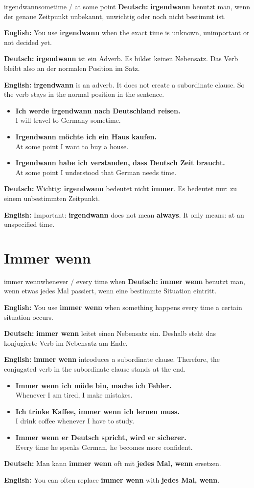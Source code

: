 \documentclass[a4paper,11pt]{article}
\newcommand{\GermanText}[1]{\textbf{Deutsch: }#1\par}
\newcommand{\EnglishText}[1]{{\small\color{SoftGray}\textbf{English: }#1\par}}
\newcommand{\ExampleItem}[2]{\item \textbf{#1}\\{\small\color{SoftGray}#2}}
\begin{document}
\begin{grammarentry}{irgendwann}{sometime / at some point}
\GermanText{\textbf{irgendwann} benutzt man, wenn der genaue Zeitpunkt unbekannt, unwichtig oder noch nicht bestimmt ist.}
\EnglishText{You use \textbf{irgendwann} when the exact time is unknown, unimportant or not decided yet.}

\GermanText{\textbf{irgendwann} ist ein Adverb. Es bildet keinen Nebensatz. Das Verb bleibt also an der normalen Position im Satz.}
\EnglishText{\textbf{irgendwann} is an adverb. It does not create a subordinate clause. So the verb stays in the normal position in the sentence.}

\begin{exbox}
\begin{itemize}
    \ExampleItem{Ich werde irgendwann nach Deutschland reisen.}{I will travel to Germany sometime.}
    \ExampleItem{Irgendwann möchte ich ein Haus kaufen.}{At some point I want to buy a house.}
    \ExampleItem{Irgendwann habe ich verstanden, dass Deutsch Zeit braucht.}{At some point I understood that German needs time.}
\end{itemize}
\end{exbox}

\GermanText{Wichtig: \textbf{irgendwann} bedeutet nicht \textbf{immer}. Es bedeutet nur: zu einem unbestimmten Zeitpunkt.}
\EnglishText{Important: \textbf{irgendwann} does not mean \textbf{always}. It only means: at an unspecified time.}
\end{grammarentry}

\section{Immer wenn}

\begin{grammarentry}{immer wenn}{whenever / every time when}
\GermanText{\textbf{immer wenn} benutzt man, wenn etwas jedes Mal passiert, wenn eine bestimmte Situation eintritt.}
\EnglishText{You use \textbf{immer wenn} when something happens every time a certain situation occurs.}

\GermanText{\textbf{immer wenn} leitet einen Nebensatz ein. Deshalb steht das konjugierte Verb im Nebensatz am Ende.}
\EnglishText{\textbf{immer wenn} introduces a subordinate clause. Therefore, the conjugated verb in the subordinate clause stands at the end.}

\begin{exbox}
\begin{itemize}
    \ExampleItem{Immer wenn ich müde bin, mache ich Fehler.}{Whenever I am tired, I make mistakes.}
    \ExampleItem{Ich trinke Kaffee, immer wenn ich lernen muss.}{I drink coffee whenever I have to study.}
    \ExampleItem{Immer wenn er Deutsch spricht, wird er sicherer.}{Every time he speaks German, he becomes more confident.}
\end{itemize}
\end{exbox}

\GermanText{Man kann \textbf{immer wenn} oft mit \textbf{jedes Mal, wenn} ersetzen.}
\EnglishText{You can often replace \textbf{immer wenn} with \textbf{jedes Mal, wenn}.}
\end{grammarentry}
\end{document}
